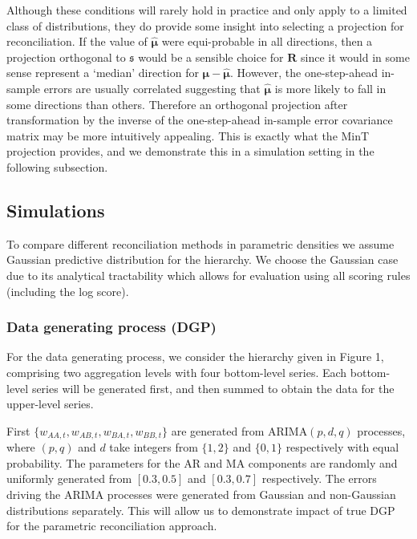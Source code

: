 \documentclass[12pt]{article}
\theoremstyle{definition}
\begin{document}
Although these conditions will rarely hold in practice and only apply to a limited class of distributions, they do provide some insight into selecting a projection for reconciliation. If the value of $\hat{\bm{\mu}}$ were equi-probable in all directions, then a projection orthogonal to $\mathfrak{s}$ would be a sensible choice for $\bm{R}$ since it would in some sense represent a `median' direction for $\bm{\mu}-\hat{\bm{\mu}}$. However, the one-step-ahead in-sample errors are usually correlated suggesting that $\hat{\bm{\mu}}$ is more likely to fall in some directions than others. Therefore an orthogonal projection after transformation by the inverse of the one-step-ahead in-sample error covariance matrix may be more intuitively appealing. This is exactly what the MinT projection provides, and we demonstrate this in a simulation setting in the following subsection. 

\subsection{Simulations}

To compare different reconciliation methods in parametric densities we assume Gaussian predictive distribution for the hierarchy. We choose the Gaussian case due to its analytical tractability which allows for evaluation using all scoring rules (including the log score). 


\subsubsection{Data generating process (DGP)} \label{subsec:DGP}

For the data generating process, we consider the hierarchy given in Figure 1, comprising two aggregation levels with four bottom-level series. Each bottom-level series will be generated first, and then summed to obtain the data for the upper-level series. 

First $\{w_{AA,t},w_{AB,t},w_{BA,t},w_{BB,t}\}$ are generated from ARIMA$(p,d,q)$ processes, where $(p,q)$ and $d$ take integers from $\{1,2\}$ and $\{0,1\}$ respectively with equal probability. The parameters for the AR and MA components are randomly and uniformly generated from $[0.3,0.5]$ and $[0.3,0.7]$ respectively. 
The errors driving the ARIMA processes were generated from Gaussian and non-Gaussian distributions separately. This will allow us to demonstrate impact of true DGP for the parametric reconciliation approach. 
\end{document}
